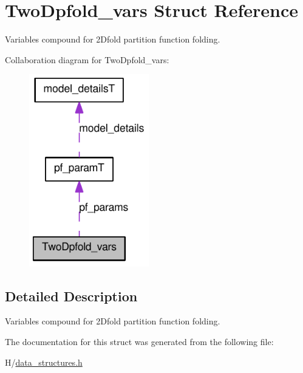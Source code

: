 \hypertarget{structTwoDpfold__vars}{
\section{TwoDpfold\_\-vars Struct Reference}
\label{structTwoDpfold__vars}
}


Variables compound for 2Dfold partition function folding.  




Collaboration diagram for TwoDpfold\_\-vars:\nopagebreak
\begin{figure}[H]
\begin{center}
\leavevmode
\includegraphics[width=148pt]{structTwoDpfold__vars__coll__graph}
\end{center}
\end{figure}


\subsection{Detailed Description}
Variables compound for 2Dfold partition function folding. 

The documentation for this struct was generated from the following file:\begin{DoxyCompactItemize}
\item 
H/\hyperlink{data__structures_8h}{data\_\-structures.h}\end{DoxyCompactItemize}
